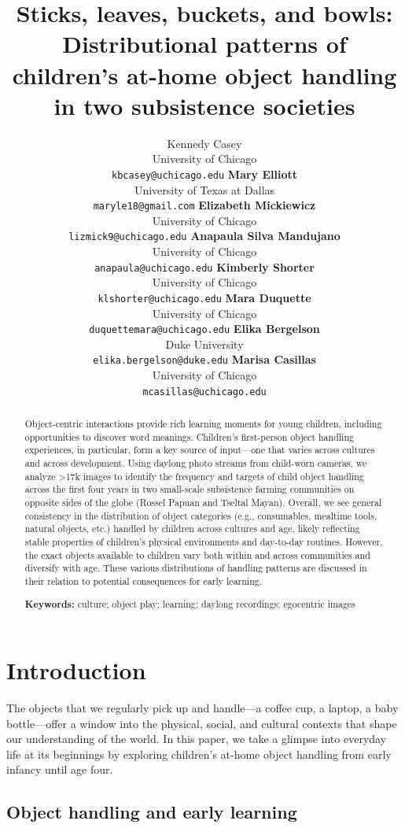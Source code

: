 \documentclass[10pt, letterpaper]{article}
\title{Sticks, leaves, buckets, and bowls: Distributional patterns of
children's at-home object handling in two subsistence societies}
\author{Kennedy Casey \\
        University of Chicago \\
        \texttt{\small{kbcasey@uchicago.edu}}
\And \textbf{Mary Elliott} \\
             University of Texas at Dallas \\
             \texttt{\small{maryle18@gmail.com}}
\And \textbf{Elizabeth Mickiewicz} \\
             University of Chicago \\
             \texttt{\small{lizmick9@uchicago.edu}}    
\And \textbf{Anapaula Silva Mandujano} \\
             University of Chicago \\
             \texttt{\small{anapaula@uchicago.edu}}   
\AND \textbf{Kimberly Shorter} \\
             University of Chicago \\
             \texttt{\small{klshorter@uchicago.edu}}
\And \textbf{Mara Duquette} \\
             University of Chicago \\
             \texttt{\small{duquettemara@uchicago.edu}}
\And \textbf{Elika Bergelson} \\
             Duke University \\
             \texttt{\small{elika.bergelson@duke.edu}}
\And \textbf{Marisa Casillas} \\
             University of Chicago \\
             \texttt{\small{mcasillas@uchicago.edu}}}
\begin{document}
\maketitle

\begin{abstract}
Object-centric interactions provide rich learning moments for young
children, including opportunities to discover word meanings. Children's
first-person object handling experiences, in particular, form a key
source of input---one that varies across cultures and across
development. Using daylong photo streams from child-worn cameras, we
analyze \textgreater17k images to identify the frequency and targets of
child object handling across the first four years in two small-scale
subsistence farming communities on opposite sides of the globe (Rossel
Papuan and Tseltal Mayan). Overall, we see general consistency in the
distribution of object categories (e.g., consumables, mealtime tools,
natural objects, etc.) handled by children across cultures and age,
likely reflecting stable properties of children's physical environments
and day-to-day routines. However, the exact objects available to
children vary both within and across communities and diversify with age.
These various distributions of handling patterns are discussed in their
relation to potential consequences for early learning.

\textbf{Keywords:}
culture; object play; learning; daylong recordings; egocentric images
\end{abstract}

\hypertarget{introduction}{%
\section{Introduction}\label{introduction}}

The objects that we regularly pick up and handle---a coffee cup, a
laptop, a baby bottle---offer a window into the physical, social, and
cultural contexts that shape our understanding of the world. In this
paper, we take a glimpse into everyday life at its beginnings by
exploring children's at-home object handling from early infancy until
age four.

\hypertarget{object-handling-and-early-learning}{%
\subsection{Object handling and early
learning}\label{object-handling-and-early-learning}}
\end{document}
